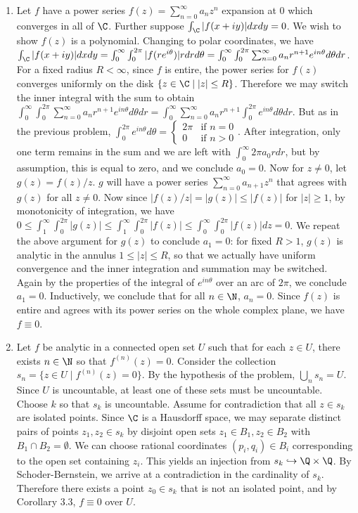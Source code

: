 \documentclass[11pt]{book}
\theoremstyle{definition}
\begin{document}
\begin{enumerate}
%
%
\item Let $f$ have a power series $f(z)=\sum_{n=0}^\infty a_nz^n$ expansion at $0$ which converges in all of $\C$. Further suppose $\int_\C |f(x+iy)|dxdy=0$. We wish to show $f(z)$ is a polynomial. Changing to polar coordinates, we have $\int_\C |f(x+iy)|dxdy = \int_0^\infty \int_0^{2\pi} |f(re^{i\theta})|rdrd\theta = \int_0^\infty \int_0^{2\pi} \sum_{n=0}^\infty a_nr^{n+1}e^{in\theta}d\theta dr$. For a fixed radius $R<\infty$, since $f$ is entire, the power series for $f(z)$ converges uniformly on the disk $\{z\in \C\mid |z|\leq R\}$. Therefore we may switch the inner integral with the sum to obtain $\int_0^\infty \int_0^{2\pi} \sum_{n=0}^\infty a_nr^{n+1}e^{in\theta}d\theta dr = \int_0^\infty \sum_{n=0}^\infty a_nr^{n+1}\int_0^{2\pi}e^{in\theta}d\theta dr$. But as in the previous problem, $\int_0^{2\pi} e^{in\theta}d\theta = \begin{cases} 2\pi & \mbox{if } n=0 \\ 0 & \mbox{if } n> 0\end{cases}$. After integration, only one term remains in the sum and we are left with $\int_0^\infty 2\pi a_0r dr$, but by assumption, this is equal to zero, and we conclude $a_0=0$. Now for $z\neq 0$, let $g(z)=f(z)/z$. $g$ will have a power series $\sum_{n=0}^\infty a_{n+1}z^n$ that agrees with $g(z)$ for all $z\neq 0$. Now since $|f(z)/z| = |g(z)| \leq |f(z)|$ for $|z|\geq 1$, by monotonicity of integration, we have $0\leq\int_1^\infty \int_0^{2\pi} |g(z)| \leq \int_1^\infty\int_0^{2\pi} |f(z)| \leq \int_0^\infty\int_0^{2\pi} |f(z)|dz = 0$. We repeat the above argument for $g(z)$ to conclude $a_1=0$: for fixed $R>1$, $g(z)$ is analytic in the annulus $1\leq |z|\leq R$, so that we actually have uniform convergence and the inner integration and summation may be switched. Again by the properties of the integral of $e^{in\theta}$ over an arc of $2\pi$, we conclude $a_1=0$. Inductively, we conclude that for all $n\in \N$, $a_n=0$. Since $f(z)$ is entire and agrees with its power series on the whole complex plane, we have $f\equiv 0$.
%
%
\item Let $f$ be analytic in a connected open set $U$ such that for each $z\in U$, there exists $n\in\N$ so that $f^{(n)}(z)=0$. Consider the collection $s_n=\{z\in U\mid f^{(n)}(z)=0\}$. By the hypothesis of the problem, $\bigcup_n s_n = U$. Since $U$ is uncountable, at least one of these sets must be uncountable. Choose $k$ so that $s_k$ is uncountable. Assume for contradiction that all $z\in s_k$ are isolated points. Since $\C$ is a Hausdorff space, we may separate distinct pairs of points $z_1,z_2\in s_k$ by disjoint open sets $z_1\in B_1, z_2\in B_2$ with $B_1\cap B_2=\emptyset$. We can choose rational coordinates $(p_i,q_i)\in B_i$ corresponding to the open set containing $z_i$. This yields an injection from $s_k\hookrightarrow \Q\times\Q$. By Schoder-Bernstein, we arrive at a contradiction in the cardinality of $s_k$. Therefore there exists a point $z_0\in s_k$ that is not an isolated point, and by Corollary 3.3, $f\equiv 0$ over $U$.

\end{enumerate}
\end{document}
